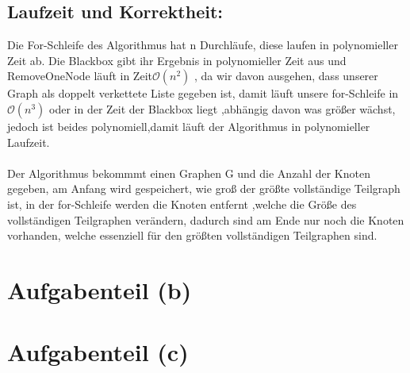 \documentclass[a4paper,11pt,oneside]{scrartcl}
\begin{document}
\subsection*{Laufzeit und Korrektheit:}
Die For-Schleife des Algorithmus hat n Durchläufe, diese laufen in polynomieller Zeit ab. Die Blackbox gibt ihr Ergebnis in polynomieller Zeit aus und RemoveOneNode läuft in Zeit$\mathcal{O}(n^2)$
, da wir davon ausgehen, dass unserer Graph als doppelt verkettete Liste gegeben ist, damit läuft unsere for-Schleife in $\mathcal{O}(n^3)$ oder in der Zeit der Blackbox liegt
,abhängig davon was größer wächst, jedoch ist beides polynomiell,damit läuft der Algorithmus in polynomieller Laufzeit.\\\\
Der Algorithmus bekommmt einen Graphen G und die Anzahl der Knoten gegeben, am Anfang wird gespeichert, wie groß der größte vollständige Teilgraph ist, in der for-Schleife werden die Knoten entfernt
,welche die Größe des vollständigen Teilgraphen verändern, dadurch sind am Ende nur noch die Knoten vorhanden, welche essenziell für den größten vollständigen Teilgraphen sind.
\section*{Aufgabenteil (b)}
\section*{Aufgabenteil (c)}
\end{document}
